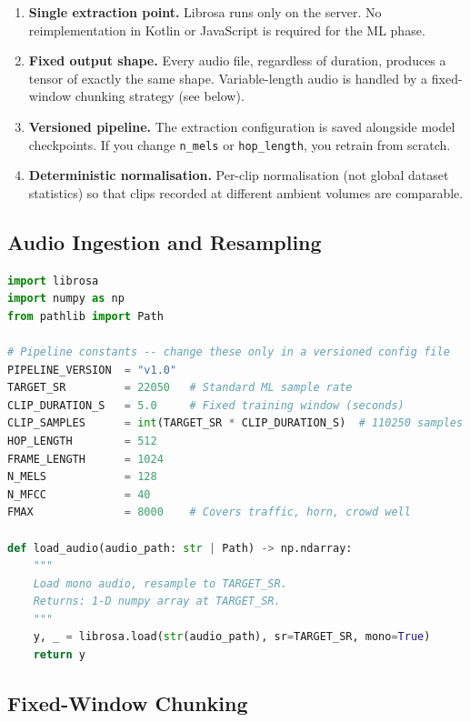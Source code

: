 \documentclass[11pt,a4paper]{article}
\begin{document}
\begin{enumerate}[leftmargin=*,noitemsep]
  \item \textbf{Single extraction point.} Librosa runs only on the server. No
        reimplementation in Kotlin or JavaScript is required for the ML phase.
  \item \textbf{Fixed output shape.} Every audio file, regardless of duration,
        produces a tensor of exactly the same shape. Variable-length audio is
        handled by a fixed-window chunking strategy (see below).
  \item \textbf{Versioned pipeline.} The extraction configuration is saved
        alongside model checkpoints. If you change \texttt{n\_mels} or
        \texttt{hop\_length}, you retrain from scratch.
  \item \textbf{Deterministic normalisation.} Per-clip normalisation (not global
        dataset statistics) so that clips recorded at different ambient volumes
        are comparable.
\end{enumerate}

\subsection{Audio Ingestion and Resampling}

\begin{lstlisting}[language=Python, caption={Audio Loading and Resampling}]
import librosa
import numpy as np
from pathlib import Path

# Pipeline constants -- change these only in a versioned config file
PIPELINE_VERSION  = "v1.0"
TARGET_SR         = 22050   # Standard ML sample rate
CLIP_DURATION_S   = 5.0     # Fixed training window (seconds)
CLIP_SAMPLES      = int(TARGET_SR * CLIP_DURATION_S)  # 110250 samples
HOP_LENGTH        = 512
FRAME_LENGTH      = 1024
N_MELS            = 128
N_MFCC            = 40
FMAX              = 8000    # Covers traffic, horn, crowd well

def load_audio(audio_path: str | Path) -> np.ndarray:
    """
    Load mono audio, resample to TARGET_SR.
    Returns: 1-D numpy array at TARGET_SR.
    """
    y, _ = librosa.load(str(audio_path), sr=TARGET_SR, mono=True)
    return y
\end{lstlisting}

\subsection{Fixed-Window Chunking}
\end{document}
